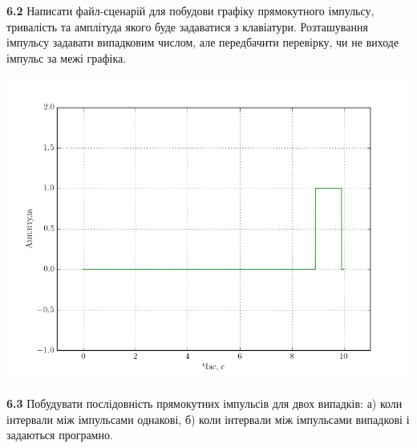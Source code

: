 \documentclass[a4paper,12pt]{article}
\begin{document}
\textbf{6.2} Написати файл-сценарій для побудови графіку прямокутного імпульсу, тривалість та амплітуда якого буде задаватися з клавіатури. Розташування імпульсу задавати випадковим числом, але передбачити перевірку, чи не виходе імпульс за межі графіка.



\begin{center}
\includegraphics[height = 12 cm,width=15 cm]{6.2r.png}
\end{center}

\textbf{6.3} Побудувати послідовність прямокутних імпульсів для двох випадків: а) коли інтервали між імпульсами однакові, б) коли інтервали між імпульсами випадкові і задаються програмно.

\end{document}
